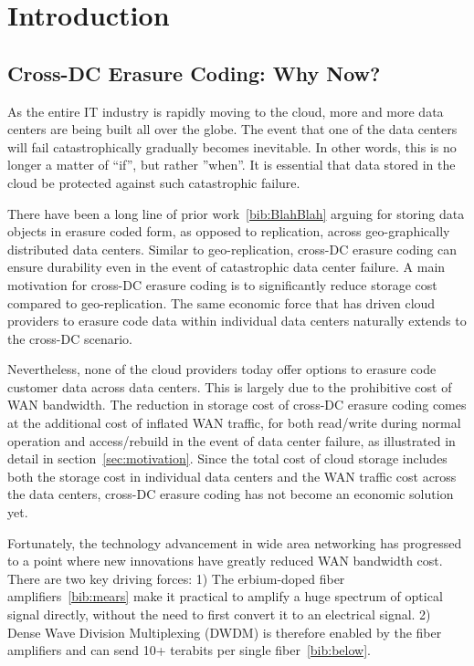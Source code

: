 \section{Introduction}

\subsection{Cross-DC Erasure Coding: Why Now?}

As the entire IT industry is rapidly moving to the cloud, more and more data centers are being built all over the globe. The event that one of the data centers will fail catastrophically gradually becomes inevitable. In other words, this is no longer a matter of ``if'', but rather ''when''. It is essential that data stored in the cloud be protected against such catastrophic failure.

There have been a long line of prior work~\ref{bib:BlahBlah} arguing for storing data objects in erasure coded form, as opposed to replication, across geo-graphically distributed data centers. Similar to geo-replication, cross-DC erasure coding can ensure durability even in the event of catastrophic data center failure. A main motivation for cross-DC erasure coding is to significantly reduce storage cost compared to geo-replication. The same economic force that has driven cloud providers to erasure code data within individual data centers naturally extends to the cross-DC scenario.

Nevertheless, none of the cloud providers today offer options to erasure code customer data across data centers. This is largely due to the prohibitive cost of WAN bandwidth. The reduction in storage cost of cross-DC erasure coding comes at the additional cost of inflated WAN traffic, for both read/write during normal operation and access/rebuild in the event of data center failure, as illustrated in detail in section~\ref{sec:motivation}.
Since the total cost of cloud storage includes both the storage cost in individual data centers and the WAN traffic cost across the data centers, cross-DC erasure coding has not become an economic solution yet.

Fortunately, the technology advancement in wide area networking has progressed to a point where new innovations have greatly reduced WAN bandwidth cost. There are two key driving forces: 1) The erbium-doped fiber amplifiers~\ref{bib:mears} make it practical to amplify a huge spectrum of optical signal directly, without the need to first convert it to an electrical signal. 2) Dense Wave Division Multiplexing (DWDM) is therefore enabled by the fiber amplifiers and can send 10+ terabits per single fiber~\ref{bib:below}.

